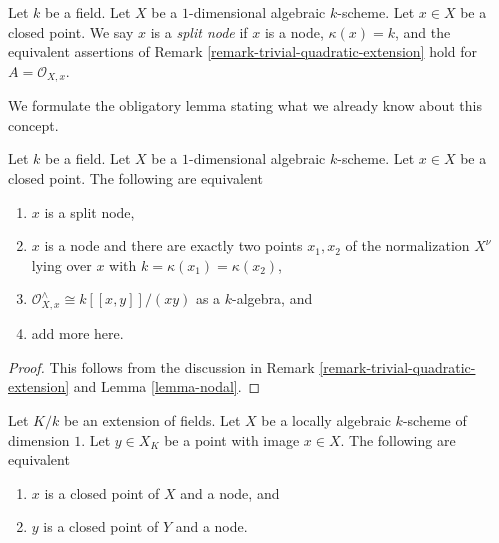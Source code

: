 \begin{definition}
\label{definition-split-node}
Let $k$ be a field. Let $X$ be a $1$-dimensional algebraic $k$-scheme.
Let $x \in X$ be a closed point. We say $x$ is a {\it split node}
if $x$ is a node, $\kappa(x) = k$, and the equivalent assertions of
Remark \ref{remark-trivial-quadratic-extension}
hold for $A = \mathcal{O}_{X, x}$.
\end{definition}

\noindent
We formulate the obligatory lemma stating what we already know
about this concept.

\begin{lemma}
\label{lemma-split-node}
Let $k$ be a field. Let $X$ be a $1$-dimensional algebraic $k$-scheme.
Let $x \in X$ be a closed point. The following are equivalent
\begin{enumerate}
\item $x$ is a split node,
\item $x$ is a node and there are exactly two points $x_1, x_2$
of the normalization $X^\nu$ lying over $x$ with
$k = \kappa(x_1) = \kappa(x_2)$,
\item $\mathcal{O}_{X, x}^\wedge \cong k[[x, y]]/(xy)$ as a $k$-algebra, and
\item add more here.
\end{enumerate}
\end{lemma}

\begin{proof}
This follows from the discussion in
Remark \ref{remark-trivial-quadratic-extension}
and Lemma \ref{lemma-nodal}.
\end{proof}

\begin{lemma}
\label{lemma-node-field-extension}
Let $K/k$ be an extension of fields. Let $X$ be a locally algebraic
$k$-scheme of dimension $1$. Let $y \in X_K$ be a point with image
$x \in X$. The following are equivalent
\begin{enumerate}
\item $x$ is a closed point of $X$ and a node, and
\item $y$ is a closed point of $Y$ and a node.
\end{enumerate}
\end{lemma}

